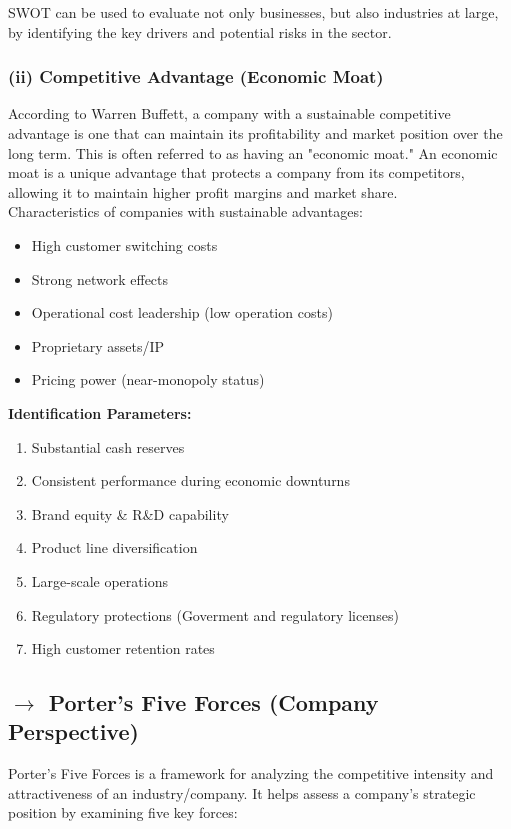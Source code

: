 \documentclass[12pt]{article}
\begin{document}
\vspace{5pt}
\noindent SWOT can be used to evaluate not only businesses, but also industries at large, by identifying the key drivers and potential risks in the sector.


\subsubsection*{(ii) Competitive Advantage (Economic Moat)}

According to Warren Buffett, a company with a sustainable competitive advantage is one that can maintain its profitability and market position over the long term. This is often referred to as having an "economic moat."
An economic moat is a unique advantage that protects a company from its competitors, allowing it to maintain higher profit margins and market share.
\\ Characteristics of companies with sustainable advantages:
\begin{itemize}
\item High customer switching costs
\item Strong network effects
\item Operational cost leadership (low operation costs)
\item Proprietary assets/IP
\item Pricing power (near-monopoly status)
\end{itemize}

\textbf{Identification Parameters:}
\begin{enumerate}
\item Substantial cash reserves
\item Consistent performance during economic downturns
\item Brand equity \& R\&D capability
\item Product line diversification
\item Large-scale operations
\item Regulatory protections (Goverment and regulatory licenses)
\item High customer retention rates
\end{enumerate}

\subsection*{$\rightarrow$ Porter's Five Forces (Company Perspective)}
Porter's Five Forces is a framework for analyzing the competitive intensity and attractiveness of an industry/company. It helps assess a company's strategic position by examining five key forces:
\end{document}
